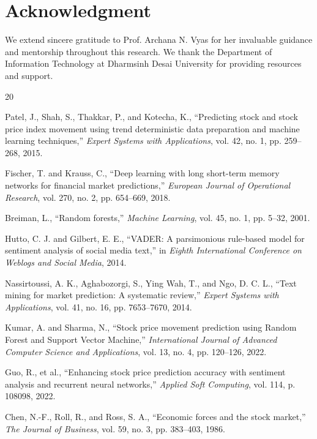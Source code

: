 \documentclass[conference]{IEEEtran}
\begin{document}
\section*{Acknowledgment}

We extend sincere gratitude to Prof. Archana N. Vyas for her invaluable guidance and mentorship throughout this research. We thank the Department of Information Technology at Dharmsinh Desai University for providing resources and support.

\begin{thebibliography}{20}

Patel, J., Shah, S., Thakkar, P., and Kotecha, K., ``Predicting stock and stock price index movement using trend deterministic data preparation and machine learning techniques,'' \textit{Expert Systems with Applications}, vol. 42, no. 1, pp. 259--268, 2015.

Fischer, T. and Krauss, C., ``Deep learning with long short-term memory networks for financial market predictions,'' \textit{European Journal of Operational Research}, vol. 270, no. 2, pp. 654--669, 2018.

Breiman, L., ``Random forests,'' \textit{Machine Learning}, vol. 45, no. 1, pp. 5--32, 2001.

Hutto, C. J. and Gilbert, E. E., ``VADER: A parsimonious rule-based model for sentiment analysis of social media text,'' in \textit{Eighth International Conference on Weblogs and Social Media}, 2014.

Nassirtoussi, A. K., Aghabozorgi, S., Ying Wah, T., and Ngo, D. C. L., ``Text mining for market prediction: A systematic review,'' \textit{Expert Systems with Applications}, vol. 41, no. 16, pp. 7653--7670, 2014.

Kumar, A. and Sharma, N., ``Stock price movement prediction using Random Forest and Support Vector Machine,'' \textit{International Journal of Advanced Computer Science and Applications}, vol. 13, no. 4, pp. 120--126, 2022.

Guo, R., et al., ``Enhancing stock price prediction accuracy with sentiment analysis and recurrent neural networks,'' \textit{Applied Soft Computing}, vol. 114, p. 108098, 2022.

Chen, N.-F., Roll, R., and Ross, S. A., ``Economic forces and the stock market,'' \textit{The Journal of Business}, vol. 59, no. 3, pp. 383--403, 1986.


\end{thebibliography}
\end{document}
